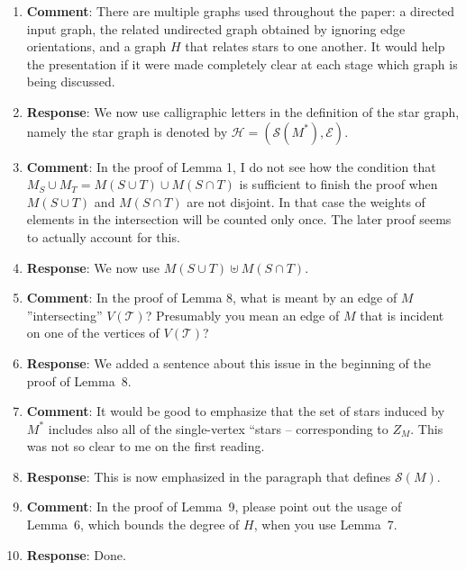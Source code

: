 \documentclass[11pt]{article}
\begin{document}
\begin{enumerate}

\item \textbf{Comment}: There are multiple graphs used throughout the
  paper: a directed input graph, the related undirected graph
  obtained by ignoring edge orientations, and a graph $H$ that relates
  stars to one another. It would help the presentation if it were made
  completely clear at each stage which graph is being discussed.
  
\item[] \textbf{Response}: We now use calligraphic letters in the
  definition of the star graph, namely the star graph is denoted by
  $\mathcal{H} = (\mathcal{S}(M^*),\mathcal{E})$.
  
\item \textbf{Comment}: In the proof of Lemma 1, I do not see how the
  condition that $M_S \cup M_T = M(S \cup T) \cup M(S \cap T)$ is
  sufficient to finish the proof when $M(S \cup T)$ and $M(S \cap T)$
  are not disjoint. In that case the weights of elements in the
  intersection will be counted only once. The later proof seems to
  actually account for this.

\item[] \textbf{Response}: We now use $M(S \cup T) \uplus M(S \cap
  T)$.
  
\item \textbf{Comment}: In the proof of Lemma 8, what is meant by an
  edge of $M$ ”intersecting” $V(\mathcal{T})$?  Presumably you mean an
  edge of $M$ that is incident on one of the vertices of
  $V(\mathcal{T})$?

\item[] \textbf{Response}: We added a sentence about this issue in the
  beginning of the proof of Lemma~8.

\item \textbf{Comment}: It would be good to emphasize that the set of
  stars induced by $M^*$ includes also all of the single-vertex
  ``stars -- corresponding to $Z_M$.  This was not so clear to me on
  the first reading.
  
\item[] \textbf{Response}: This is now emphasized in the paragraph
  that defines $\mathcal{S}(M)$.

\item \textbf{Comment}: In the proof of Lemma~9, please point out the
  usage of Lemma~6, which bounds the degree of $H$, when you use Lemma~7.

\item[] \textbf{Response}: Done.
  

\end{enumerate}
\end{document}

